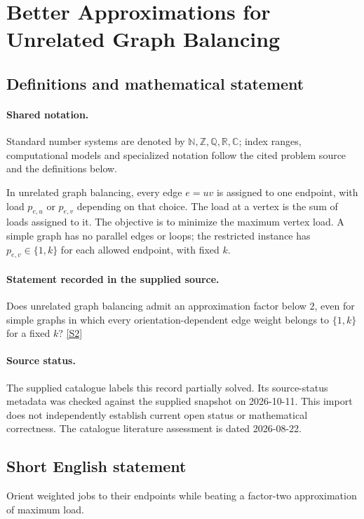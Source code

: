 \documentclass[11pt]{article}
\newcommand{\sref}[2]{\hyperlink{source:#1:#2}{[S#2]}}
\begin{document}
\section{Better Approximations for Unrelated Graph Balancing}\label{statement}

\subsection{Definitions and mathematical statement}

\paragraph{Shared notation.}Standard number systems are denoted by $\mathbb N,\mathbb Z,\mathbb Q,\mathbb R,\mathbb C$; index ranges, computational models and specialized notation follow the cited problem source and the definitions below.


In unrelated graph balancing, every edge $e=uv$ is assigned to one endpoint, with load $p_{e,u}$ or $p_{e,v}$ depending on that choice. The load at a vertex is the sum of loads assigned to it. The objective is to minimize the maximum vertex load. A simple graph has no parallel edges or loops; the restricted instance has $p_{e,v}\in\{1,k\}$ for each allowed endpoint, with fixed $k$.
\paragraph{Statement recorded in the supplied source.}
Does unrelated graph balancing admit an approximation factor below $2$, even for simple graphs in which every orientation-dependent edge weight belongs to $\{1,k\}$ for a fixed $k$? \sref{statement}{2}
\paragraph{Source status.}
The supplied catalogue labels this record partially solved. Its source-status metadata was checked against the supplied snapshot on 2026-10-11. This import does not independently establish current open status or mathematical correctness. The catalogue literature assessment is dated 2026-08-22.
\subsection{Short English statement}
Orient weighted jobs to their endpoints while beating a factor-two approximation of maximum load.
\end{document}
